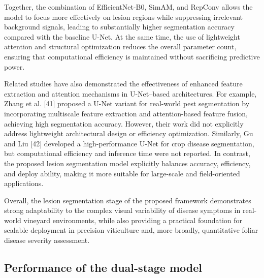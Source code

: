 \documentclass[
]{article}
\begin{document}
Together, the combination of EfficientNet-B0, SimAM, and RepConv allows
the model to focus more effectively on lesion regions while suppressing
irrelevant background signals, leading to substantially higher
segmentation accuracy compared with the baseline U-Net. At the same
time, the use of lightweight attention and structural optimization
reduces the overall parameter count, ensuring that computational
efficiency is maintained without sacrificing predictive power.

Related studies have also demonstrated the effectiveness of enhanced
feature extraction and attention mechanisms in U-Net--based
architectures. For example, Zhang et al. {[}41{]} proposed a U-Net
variant for real-world pest segmentation by incorporating multiscale
feature extraction and attention-based feature fusion, achieving high
segmentation accuracy. However, their work did not explicitly address
lightweight architectural design or efficiency optimization. Similarly,
Gu and Liu {[}42{]} developed a high-performance U-Net for crop disease
segmentation, but computational efficiency and inference time were not
reported. In contrast, the proposed lesion segmentation model explicitly
balances accuracy, efficiency, and deploy ability, making it more
suitable for large-scale and field-oriented applications.

Overall, the lesion segmentation stage of the proposed framework
demonstrates strong adaptability to the complex visual variability of
disease symptoms in real-world vineyard environments, while also
providing a practical foundation for scalable deployment in precision
viticulture and, more broadly, quantitative foliar disease severity
assessment.

\hypertarget{performance-of-the-dual-stage-model}{%
\subsection{Performance of the dual-stage
model}\label{performance-of-the-dual-stage-model}}
\end{document}
